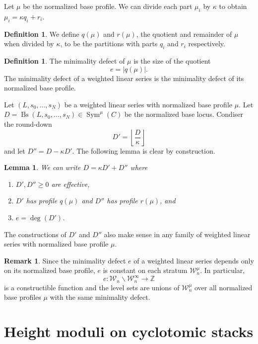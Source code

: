 \documentclass[a4paper,12pt]{amsart}
\newtheorem{lem}[thm]{Lemma}
\theoremstyle{definition}
\newtheorem{defn}[thm]{Definition}
\newtheorem{rmk}[thm]{Remark}
\newcommand{\cW}{\mathcal{W}}
\DeclareMathOperator{\Bs}{Bs}
\DeclareMathOperator{\Sym}{Sym}
\renewcommand{\setminus}{\smallsetminus}
\begin{document}
	Let $\mu$ be the normalized base profile. We can divide each part $\mu_i$ by $\kappa$ to obtain $\mu_i = \kappa q_i + r_i$. 
	\begin{defn}
		We define $q(\mu)$ and $r(\mu)$, the quotient and remainder of $\mu$ when divided by $\kappa$, to be the partitions with parts $q_i$ and $r_i$ respectively. 
	\end{defn}
	\begin{defn}
		The minimality defect of $\mu$ is the size of the quotient
		$$
		e = |q(\mu)|. 
		$$
		The minimality defect of a weighted linear series is the minimality defect of its normalized base profile. 
	\end{defn}
	Let $(L,s_0, \ldots, s_N)$ be a weighted linear series with normalized base profile $\mu$. Let $D = \overline{\Bs}(L, s_0, \ldots, s_N) \in \Sym^{\mu}(C)$ be the normalized base locus. Condiser the round-down
	$$
	D' = \left \lfloor \frac{D}{\kappa} \right \rfloor
	$$
	and let $D'' = D - \kappa D'$. The following lemma is clear by construction. 
	
	\begin{lem} \label{div_rem} We can write $D = \kappa D' + D''$ where
		\begin{enumerate}[(1)]
			\item $D', D'' \geq 0$ are effective, 
			\item $D'$ has profile $q(\mu)$ and $D''$ has profile $r(\mu)$, and
			\item $e = \deg(D')$. 
		\end{enumerate}
	\end{lem}
	
	The constructions of $D'$ and $D''$ also make sense in any family of weighted linear series with normalized base profile $\mu$. 
	
	\begin{rmk}
		Since the minimality defect $e$ of a weighted linear series depends only on its normalized base profile, $e$ is constant on each stratum $\cW^{\mu}_n$. In particular, 
		$$
		e : \cW_n \setminus \cW_n^\infty \to \mathbb{Z}
		$$
		is a constructible function and the level sets are unions of $\cW^{\mu}_n$ over all normalized base profiles $\mu$ with the same minimality defect. 
	\end{rmk}
	
	
	
	
	
	
	
	\section{Height moduli on cyclotomic stacks}\label{sec:moduli}
	
\end{document}
